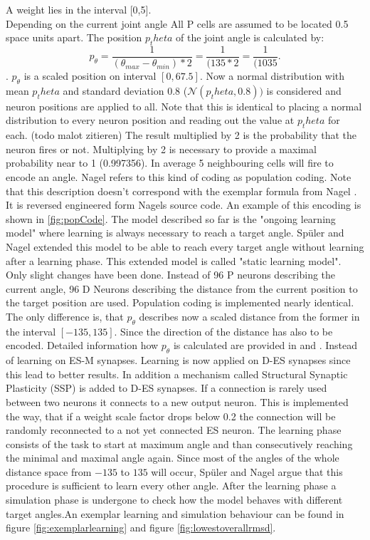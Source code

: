 A weight lies in the interval [0,5].\\
Depending on the current joint angle
All P cells are assumed to be located 0.5 space units apart. The position $p_theta$ of the joint angle is calculated by:
\begin{equation*}
	p_\theta=\dfrac{1}{(\theta_{max}-\theta_{min})*2} =\dfrac{1}{(135*2}=\dfrac{1}{(1035}.
\end{equation*}.
$p_\theta$ is a scaled position on interval $[0,67.5]$.
Now a normal distribution with mean $p_theta$ and standard deviation $0.8$ ($\mathcal{N}(p_theta,0.8))$ is considered and neuron positions are applied to all.  Note that this is identical to placing a normal distribution to every neuron position and reading out the value at $p_theta$ for each. (todo malot zitieren)
The result multiplied by 2 is the probability that the neuron fires or not. Multiplying by 2 is necessary to provide a maximal probability near to 1 (0.997356). In average 5 neighbouring cells will fire to encode an angle. Nagel \cite{sebastianMasterThesis} refers to this kind of coding as population coding.  Note that this description doesn't correspond with the exemplar formula from Nagel \cite[p 18]{sebastianMasterThesis}. It is reversed engineered form Nagels source code. An example of this encoding is shown in \ref{fig:popCode}.
The model described so far is the "ongoing learning model" where learning is always necessary to reach a target angle.
Spüler and Nagel extended this model to be able to reach every target angle without learning after a learning phase.
This extended model is called "static learning model".
Only slight changes have been done. Instead of 96 P neurons describing the current angle, 96 D Neurons describing the distance from the current position to the target position are used.  Population coding is implemented nearly identical.  The only difference is, that $p_\theta$ describes now a scaled distance from the former in the interval $[-135,135]$. Since the direction of the distance has also to be encoded. Detailed information how $p_\theta$ is calculated are provided in \cite[p. 41-43]{sebastianMasterThesis} and \cite{sebastianPaper}.
Instead of learning on ES-M synapses. Learning is now applied on D-ES synapses since this lead to better results.
In addition a mechanism called Structural Synaptic Plasticity (SSP) is added to D-ES synapses. If a connection is rarely used between two neurons it connects to a new output neuron. This is implemented the way, that if a weight scale factor drops below 0.2 the connection will be randomly reconnected to a not yet connected ES neuron.  The learning phase consists of the task to start at maximum angle and than consecutively reaching the minimal and maximal angle again. Since most of the angles of the whole distance space from  $-135$ to $135$ will occur, Spüler and Nagel argue that this procedure is sufficient to learn every other angle.  After the learning phase a simulation phase is undergone to check how the model behaves with different target angles.An exemplar learning and simulation behaviour can be found in figure \ref{fig:exemplarlearning} and figure \ref{fig:lowestoverallrmsd}.

